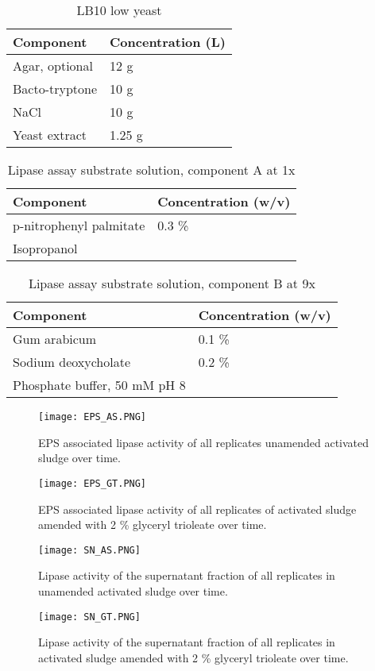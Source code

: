 \documentclass[11pt]{article}
\begin{document}
\begin{table}
\caption{LB10 low yeast}
\begin{tabular}{  p{6.9cm} | p{6.9cm} }
\hline
Component & Concentration (L) \\
\hline
 Agar, optional & 12 g  \\
Bacto-tryptone    & 10 g  \\
   NaCl   & 10 g  \\
    Yeast extract    & 1.25 g \\
  \hline
\end{tabular}
\end{table}


\begin{table}
\caption{Lipase assay substrate solution, component A at 1x}
\begin{tabular}{  p{6.9cm} | p{6.9cm} }
\hline
Component & Concentration (w/v) \\
\hline
 p-nitrophenyl palmitate   & 0.3 \% \\
 Isopropanol &  \\
 \hline
\end{tabular}
\end{table}

\begin{table}
\caption{Lipase assay substrate solution, component B at 9x}
\begin{tabular}{  p{6.9cm} | p{6.9cm} }
\hline
Component & Concentration (w/v) \\
\hline
 Gum arabicum & 0.1 \% \\
  Sodium deoxycholate & 0.2 \% \\
  Phosphate buffer, 50 mM pH 8   &  \\
  \hline
\end{tabular}
\end{table}

\begin{figure}
\texttt{[image: EPS\_AS.PNG]}
\caption{EPS associated lipase activity of all replicates unamended activated sludge over time.}
\end{figure}

\begin{figure}
\texttt{[image: EPS\_GT.PNG]}
\caption{EPS associated lipase activity of all replicates of activated sludge amended with 2 \% glyceryl trioleate over time.}
\end{figure}

\begin{figure}
\texttt{[image: SN\_AS.PNG]}
\caption{Lipase activity of the supernatant fraction of all replicates in unamended activated sludge over time.}
\end{figure}
\begin{figure}
\texttt{[image: SN\_GT.PNG]}
\caption{Lipase activity of the supernatant fraction of all replicates in activated sludge amended with 2 \% glyceryl trioleate over time.}
\end{figure}
\end{document}
